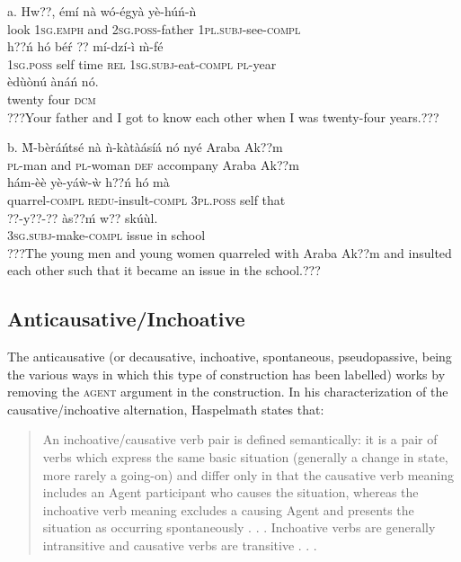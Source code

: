 \documentclass[output=paper]{langsci/langscibook}
\begin{document}
\ea
\gll a.  Hw??,  émí     nà   wó-égyà     yè-húń-ǹ       \\
       look  \textsc{1sg.emph}  and  \textsc{2sg.poss}{}-father  \textsc{1pl.subj}{}-see-\textsc{compl}  \\
\gll   h??ń    hó   bé\'{r}   ??  mí-dzí-ì     \`{m}-fé  \\
       \textsc{1sg.poss}  self  time  \textsc{rel}  \textsc{1sg.subj}{}-eat-\textsc{compl}  \textsc{pl}{}-year\\
\gll   èd\`{u}ònú   ànáń     nó.     \\
       twenty    four    \textsc{dcm}\\
\glt ???Your father and I got to know each other when I was twenty-four years.??? \citep[9]{Martin1936}
\z

\ea
\gll  b.  \`{M}-bèráńtsé  nà  ǹ-kàtàásíá  nó   nyé     Araba Ak??m  \\
       \textsc{pl}{}-man    and  \textsc{pl}{}-woman  \textsc{def}  accompany  Araba Ak??m\\
\gll   hám-èè      yè-yáẁ-ẁ    h??ń    hó  mà\\
       quarrel-\textsc{compl}    \textsc{redu}{}-insult-\textsc{compl}  \textsc{3pl.poss}  self  that\\
\gll   ??{}-y??-??        às??ḿ  w??  skú\`{u}l.\\
       \textsc{3sg.subj}{}-make-\textsc{compl}  issue  in  school\\
\glt ???The young men and young women quarreled with Araba Ak??m and insulted each other such that it became an issue in the school.??? \citep[21]{Martin1936}  
\z

\subsection{Anticausative/Inchoative}

The anticausative (or decausative, inchoative, spontaneous, pseudopassive, being the various ways in which this type of construction has been labelled) works by removing the \textsc{agent} argument in the construction. In his characterization of the causative/inchoative alternation, Haspelmath states that:

\begin{quote}
An inchoative/causative verb pair is defined semantically: it is a pair of verbs which express the same basic situation (generally a change in state, more rarely a going-on) and differ only in that the causative verb meaning includes an Agent participant who causes the situation, whereas the inchoative verb meaning excludes a causing Agent and presents the situation as occurring spontaneously . . . Inchoative verbs are generally intransitive and causative verbs are transitive . . . \citep[90]{Haspelmath1993}
\end{quote}
\end{document}
